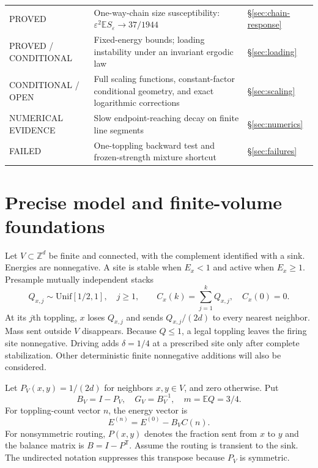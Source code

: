 \documentclass[11pt]{article}
\numberwithin{equation}{section}
\theoremstyle{definition}
\newcommand{\E}{\mathbb E}
\newcommand{\Z}{\mathbb Z}
\begin{document}
\begin{longtable}{@{}>{\raggedright\arraybackslash}p{}>{\raggedright\arraybackslash}p{}>{\raggedright\arraybackslash}p{}@{}}
PROVED & One-way-chain size susceptibility: $\varepsilon^2\E S_\varepsilon\to37/1944$ & \S\ref{sec:chain-response}\\
PROVED / CONDITIONAL & Fixed-energy bounds; loading instability under an invariant ergodic law & \S\ref{sec:loading}\\
CONDITIONAL / OPEN & Full scaling functions, constant-factor conditional geometry, and exact logarithmic corrections & \S\ref{sec:scaling}\\
NUMERICAL EVIDENCE & Slow endpoint-reaching decay on finite line segments & \S\ref{sec:numerics}\\
FAILED & One-toppling backward test and frozen-strength mixture shortcut & \S\ref{sec:failures}\\
\bottomrule
\end{longtable}

\section{Precise model and finite-volume foundations}\label{sec:finite}

Let $V\subset\Z^d$ be finite and connected, with the complement identified with a sink. Energies are nonnegative. A site is stable when $E_x<1$ and active when $E_x\ge1$. Presample mutually independent stacks
\[
 Q_{x,j}\sim\mathrm{Unif}[1/2,1],\quad j\ge1,\qquad
 C_x(k)=\sum_{j=1}^k Q_{x,j},\quad C_x(0)=0.
\]
At its $j$th toppling, $x$ loses $Q_{x,j}$ and sends $Q_{x,j}/(2d)$ to every nearest neighbor. Mass sent outside $V$ disappears. Because $Q\le1$, a legal toppling leaves the firing site nonnegative. Driving adds $\delta=1/4$ at a prescribed site only after complete stabilization. Other deterministic finite nonnegative additions will also be considered.

Let $P_V(x,y)=1/(2d)$ for neighbors $x,y\in V$, and zero otherwise. Put
\[
 B_V=I-P_V,\quad G_V=B_V^{-1},\quad m=\E Q=3/4.
\]
For toppling-count vector $n$, the energy vector is
\begin{equation}\label{eq:stack-balance}
 E^{(n)}=E^{(0)}-B_V C(n).
\end{equation}
For nonsymmetric routing, $P(x,y)$ denotes the fraction sent from $x$ to $y$ and the balance matrix is $B=I-P^{\mathsf T}$. Assume the routing is transient to the sink. The undirected notation suppresses this transpose because $P_V$ is symmetric.
\end{document}
